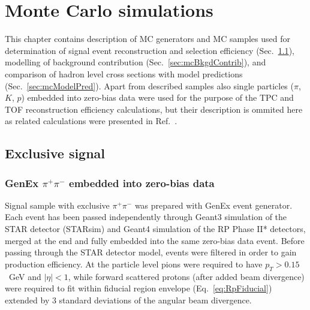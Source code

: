 

\chapter{Monte Carlo simulations}\label{chap:mc}

This chapter contains description of MC generators and MC samples used for determination of signal event reconstruction and selection efficiency (Sec.~\ref{sec:mcExclusiveSignal}), modelling of background contribution (Sec.~\ref{sec:mcBkgdContrib}), and comparison of hadron level cross sections with model predictions (Sec.~\ref{sec:mcModelPred}). Apart from described samples also single particles ($\pi$, $K$, $p$) embedded into zero-bias data were used for the purpose of the TPC and TOF reconstruction efficiency calculations, but their description is ommited here as related calculations were presented in Ref.~\cite{supplementaryNote}.

\section{Exclusive signal}\label{sec:mcExclusiveSignal}

\subsection{GenEx $\pi^{+}\pi^{-}$ embedded into zero-bias data}

Signal sample with exclusive $\pi^{+}\pi^{-}$ was prepared with GenEx\cite{GenEx} event generator. Each event has been passed independently through Geant3 simulation of the STAR detector (STARsim) and Geant4 simulation of the RP Phase II* detectors, merged at the end and fully embedded into the same zero-bias data event. Before passing through the STAR detector model, events were filtered in order to gain production efficiency. At the particle level pions were required to have $p_{T}>0.15$~GeV and $|\eta|<1$, while forward scattered protons (after added beam divergence) were required to fit within fiducial region envelope (Eq.~\eqref{eq:RpFiducial}) extended by 3 standard deviations of the angular beam divergence.


